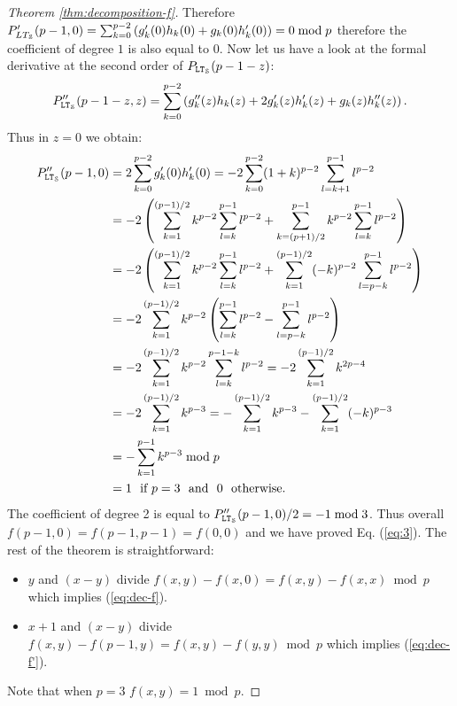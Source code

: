 \begin{proof}[Theorem \ref{thm:decomposition-f}]
Therefore $P'_{LT_\S}(p-1,0) = \sum_{k=0}^{p-2}\left(g_k'(0)h_k(0) + g_k(0)h'_k(0) \right) = 0 \bmod p$ therefore the coefficient of degree $1$ is also equal to $0$. Now let us have a look at the formal derivative at the second order of $P_{\LT_\S}(p-1-z)$:
$$P''_{\LT_\S}(p-1-z,z) = \sum_{k=0}^{p-2}\left(g_k''(z)h_k(z) + 2g_k'(z)h'_k(z) + g_k(z)h''_k(z) \right).$$
Thus in $z=0$ we obtain: 
\begin{align*}
  P''_{\LT_\S}(p-1,0) & = 2\sum_{k=0}^{p-2}g_k'(0)h'_k(0) = -2\sum_{k=0}^{p-2}(1+k)^{p-2}\sum_{l=k+1}^{p-1}l^{p-2} \\
                      &= -2\left(\sum_{k=1}^{(p-1)/2}k^{p-2}\sum_{l=k}^{p-1}l^{p-2} + \sum_{k=(p+1)/2}^{p-1}k^{p-2}\sum_{l=k}^{p-1}l^{p-2}\right) \\
                      & = -2\left(\sum_{k=1}^{(p-1)/2}k^{p-2}\sum_{l=k}^{p-1}l^{p-2} + \sum_{k=1}^{(p-1)/2}(-k)^{p-2}\sum_{l=p-k}^{p-1}l^{p-2}\right) \\
                      & = -2\sum_{k=1}^{(p-1)/2}k^{p-2}\left(\sum_{l=k}^{p-1}l^{p-2} -  \sum_{l=p-k}^{p-1}l^{p-2}\right) \\
                      & = -2\sum_{k=1}^{(p-1)/2}k^{p-2}\sum_{l=k}^{p-1-k}l^{p-2} = -2\sum_{k=1}^{(p-1)/2}k^{2p-4} \\
                      & = -2\sum_{k=1}^{(p-1)/2}k^{p-3} = -\sum_{k=1}^{(p-1)/2}k^{p-3} - \sum_{k=1}^{(p-1)/2}(-k)^{p-3} \\
                      & = -\sum_{k=1}^{p-1}k^{p-3}  \bmod p\\
                      & = 1 ~\text{ if } p = 3 ~\text{ and }~ 0 ~\text{ otherwise.}
\end{align*}
The coefficient of degree 2 is equal to $P''_{\LT_\S}(p-1,0)/2 = -1 \bmod 3$.
Thus overall $f(p-1,0) = f(p-1,p-1) = f(0,0)$ and we have proved Eq. (\ref{eq:3}). The rest of the theorem is straightforward:
\begin{itemize}
\item $y$ and $(x-y)$ divide $f(x,y)-f(x,0) = f(x,y)-f(x,x) \bmod p$ which implies (\ref{eq:dec-f}). 
\item $x+1$ and $(x-y)$ divide $f(x,y)-f(p-1,y) = f(x,y)-f(y,y) \bmod p$ which implies (\ref{eq:dec-f'}).
\end{itemize}
Note that when $p=3$ $f(x,y) = 1 \bmod p.$
\end{proof}
  
  
